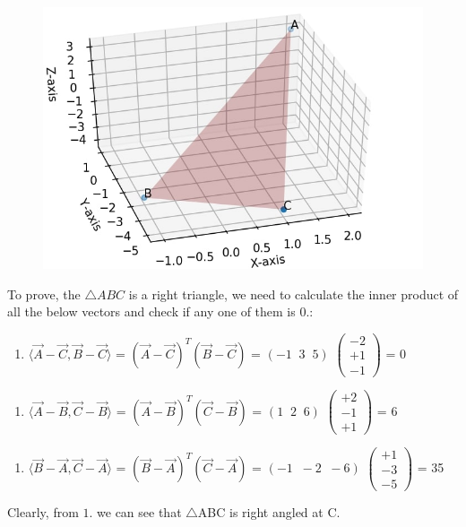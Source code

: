 \documentclass{article}
\begin{document}
\begin{figure}[!htb]
	
	\centering
	
	\includegraphics[width=\columnwidth]{assignment1fig-1.jpg}
	
	\caption{\label{fig1}}
	
	\label{fig:}
	
\end{figure}

To prove, the $\triangle ABC$ is a right triangle, we need to calculate the inner product of all the below vectors and check if any one of them is 0.:
\begin{enumerate}[1.]
	\item $\langle \vec{A}-\vec{C}   ,\vec{B}-\vec{C}\rangle$ = $(\vec{A} -\vec{C})^T (\vec{B}-\vec{C})$ = $(-1\;\; 3 \;\; 5)$ $\begin{pmatrix} 
		-2\\+1\\-1 
	\end{pmatrix}$ = 0
\end{enumerate}
\begin{enumerate}[2.]
	\item $\langle \vec{A}-\vec{B}   ,\vec{C}-\vec{B}\rangle$ = $(\vec{A} -\vec{B})^T (\vec{C}-\vec{B})$
	 = $(1\;\; 2 \;\; 6)$ $\begin{pmatrix} 
		+2\\-1\\+1 
	\end{pmatrix}$ = 6
\end{enumerate}

\begin{enumerate}[3.]
	\item $\langle \vec{B}-\vec{A}   ,\vec{C}-\vec{A}\rangle$ = $(\vec{B} -\vec{A})^T (\vec{C}-\vec{A})$ = $(-1\;\; -2 \;\; -6)$ $\begin{pmatrix} 
		+1\\-3\\-5 
	\end{pmatrix}$ = 35
\end{enumerate}
Clearly, from $1.$ we can see that $\triangle$ABC is right angled at C.
\end{document}
